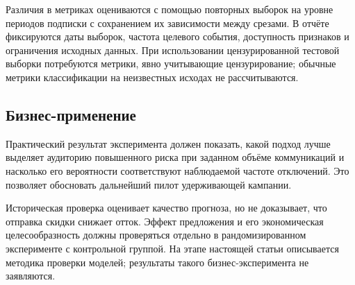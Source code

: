 \documentclass{misisarticle}
\begin{document}
Различия в метриках оцениваются с помощью повторных выборок на уровне периодов подписки с сохранением их зависимости между срезами. В отчёте фиксируются даты выборок, частота целевого события, доступность признаков и ограничения исходных данных. При использовании цензурированной тестовой выборки потребуются метрики, явно учитывающие цензурирование; обычные метрики классификации на неизвестных исходах не рассчитываются.

\subsection{Бизнес-применение}

Практический результат эксперимента должен показать, какой подход лучше выделяет аудиторию повышенного риска при заданном объёме коммуникаций и насколько его вероятности соответствуют наблюдаемой частоте отключений. Это позволяет обосновать дальнейший пилот удерживающей кампании.

Историческая проверка оценивает качество прогноза, но не доказывает, что отправка скидки снижает отток. Эффект предложения и его экономическая целесообразность должны проверяться отдельно в рандомизированном эксперименте с контрольной группой. На этапе настоящей статьи описывается методика проверки моделей; результаты такого бизнес-эксперимента не заявляются.
\end{document}
